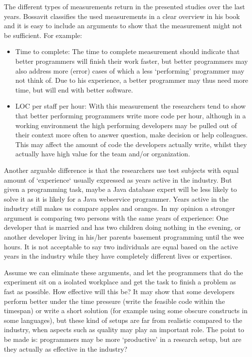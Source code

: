 The different types of measurements return in the presented studies over the last years.
Bossavit classifies the used measurements in a clear overview in his book \autocite[42-43]{bossavit2013leprechauns} and it is easy to include an arguments to show that the measurement might not be sufficient.
For example:
\begin{itemize}[noitemsep]
\item Time to complete:
The time to complete measurement should indicate that better programmers will finish their work faster,
but better programmers may also address more (error) cases of which a less `performing' programmer may not think of.
Due to his experience, a better programmer may thus need more time, but will end with better software.
\item LOC per staff per hour:
With this measurement the researchers tend to show that better performing programmers write more code per hour,
although in a working environment the high performing developers may be pulled out of their context more often to answer question, make decision or help colleagues.
This may affect the amount of code the developers actually write, whilst they actually have high value for the team and/or organization.
\end{itemize}

Another arguable difference is that the researchers use test subjects with equal amount of `experience` usually expressed as years active in the industry.
But given a programming task, maybe a Java database expert will be less likely to solve it as it is likely for a Java webservice programmer.
Years active in the industry still makes us compare apples and oranges.
In my opinion a stronger argument is comparing two persons with the same years of experience:
One developer that is married and has two children doing nothing in the evening,
or another developer living in his/her parents basement programming until the wee hours.
It is not acceptable to say two individuals are equal based on the active years in the industry while they have completely different lives or expertises.

Assume we can eliminate these arguments, and let the programmers that do the experiment sit on a isolated workplace and get the task to finish a problem as fast as possible.
How effective will this be?
It may show that some developers perform better under the time pressure (write the feasible code within the timespan) or write a short solution (for example using some obscure constructs in some languages),
but these kind of setups are far from realistic compared to the industry, when aspects such as quality may play an important role.
The point to be made is: programmers may be more `productive' in a research setup, but are they actually as effective in the industry?

